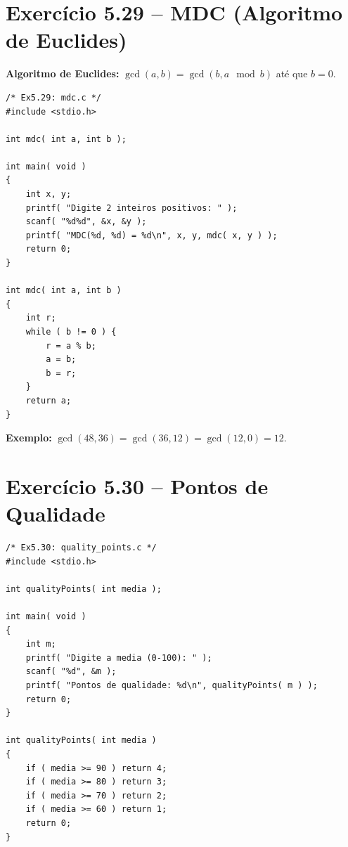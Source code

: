 \documentclass[12pt,a4paper]{article}
\begin{document}
\section{Exercício 5.29 -- MDC (Algoritmo de Euclides)}

\begin{respostabox}
\textbf{Algoritmo de Euclides:} $\gcd(a, b) = \gcd(b, a \mod b)$ até que $b = 0$.

\begin{lstlisting}
/* Ex5.29: mdc.c */
#include <stdio.h>

int mdc( int a, int b );

int main( void )
{
    int x, y;
    printf( "Digite 2 inteiros positivos: " );
    scanf( "%d%d", &x, &y );
    printf( "MDC(%d, %d) = %d\n", x, y, mdc( x, y ) );
    return 0;
}

int mdc( int a, int b )
{
    int r;
    while ( b != 0 ) {
        r = a % b;
        a = b;
        b = r;
    }
    return a;
}
\end{lstlisting}

\textbf{Exemplo:} $\gcd(48, 36) = \gcd(36, 12) = \gcd(12, 0) = 12$.
\end{respostabox}

\section{Exercício 5.30 -- Pontos de Qualidade}

\begin{respostabox}
\begin{lstlisting}
/* Ex5.30: quality_points.c */
#include <stdio.h>

int qualityPoints( int media );

int main( void )
{
    int m;
    printf( "Digite a media (0-100): " );
    scanf( "%d", &m );
    printf( "Pontos de qualidade: %d\n", qualityPoints( m ) );
    return 0;
}

int qualityPoints( int media )
{
    if ( media >= 90 ) return 4;
    if ( media >= 80 ) return 3;
    if ( media >= 70 ) return 2;
    if ( media >= 60 ) return 1;
    return 0;
}
\end{lstlisting}
\end{respostabox}

\newpage
\end{document}
